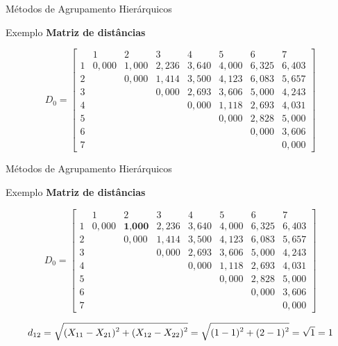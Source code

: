 \documentclass[
  ignorenonframetext,
  aspectratio=169,
]{beamer}
\begin{document}
\begin{frame}{Métodos de Agrupamento Hierárquicos}
\protect{}\label{muxe9todos-de-agrupamento-hieruxe1rquicos-13}
\begin{block}{Exemplo}
\protect{}\label{exemplo-2}
\textbf{Matriz de distâncias}

\[D_0 = \left[ \begin{matrix}
&1 & 2&3&4&5&6&7\\ 
1& 0,000 & 1,000 & 2,236 & 3,640 & 4,000 & 6,325 & 6,403 \\
2&  & 0,000 & 1,414 & 3,500 & 4,123 & 6,083 & 5,657 \\
3&  &  & 0,000 & 2,693 & 3,606 & 5,000 & 4,243 \\
4&  &  &  & 0,000 & 1,118 & 2,693 & 4,031 \\
5& &  &  &  & 0,000 & 2,828 & 5,000 \\
6&  &  &  &  &  & 0,000 & 3,606 \\
7&  &  &  &  &  &  & 0,000
                    \end{matrix} \right]\]
\end{block}
\end{frame}

\begin{frame}{Métodos de Agrupamento Hierárquicos}
\protect{}\label{muxe9todos-de-agrupamento-hieruxe1rquicos-14}
\begin{block}{Exemplo}
\protect{}\label{exemplo-3}
\textbf{Matriz de distâncias}

\[D_0 = \left[ \begin{matrix}
&1 & 2&3&4&5&6&7\\ 
1& 0,000 & \textbf{1,000} & 2,236 & 3,640 & 4,000 & 6,325 & 6,403 \\
2&  & 0,000 & 1,414 & 3,500 & 4,123 & 6,083 & 5,657 \\
3&  &  & 0,000 & 2,693 & 3,606 & 5,000 & 4,243 \\
4&  &  &  & 0,000 & 1,118 & 2,693 & 4,031 \\
5& &  &  &  & 0,000 & 2,828 & 5,000 \\
6&  &  &  &  &  & 0,000 & 3,606 \\
7&  &  &  &  &  &  & 0,000
                    \end{matrix} \right]\]

\[\scriptsize d_{12} = \sqrt{\displaystyle{(X_{11} - X_{21})^2 + (X_{12} - X_{22})^2}} = 
\sqrt{\displaystyle{(1 - 1)^2 + (2 - 1)^2}} = \sqrt{1} = 1\]
\end{block}
\end{frame}
\end{document}
